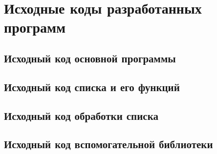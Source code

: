 \section{Исходные коды разработанных программ}

\subsection{Исходный код основной программы}


\subsection{Исходный код списка и его функций}



\subsection{Исходный код обработки списка}



\subsection{Исходный код вспомогательной библиотеки}

